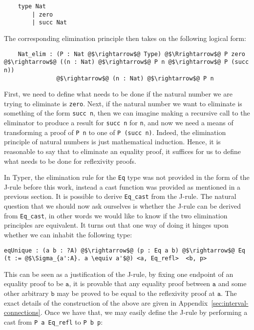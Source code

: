 \documentclass[12pt,twoside,maitrise]{dms}
\theoremstyle{definition}
\numberwithin{equation}{section}
\numberwithin{table}{chapter}
\numberwithin{figure}{chapter}
\newcommand\id[1] {\texttt{#1}}
\newcommand\fn[1] {\texttt{#1}}
\begin{document}
\begin{verbatim}
    type Nat
        | zero
        | succ Nat
\end{verbatim}

The corresponding elimination principle then takes on the following logical form:

\begin{verbatim}
    Nat_elim : (P : Nat @$\rightarrow$@ Type) @$\Rrightarrow$@ P zero @$\rightarrow$@ ((n : Nat) @$\rightarrow$@ P n @$\rightarrow$@ P (succ n))
               @$\rightarrow$@ (n : Nat) @$\rightarrow$@ P n
\end{verbatim}

First, we need to define what needs to be done if the natural number we are
trying to eliminate is \id{zero}. Next, if the natural number we want to
eliminate is something of the form \fn{succ n}, then we can imagine making a
recursive call to the eliminator to produce a result for \fn{succ n} for \id{n},
and now we need a means of transforming a proof of \fn{P n} to one of \fn{P
  (succ n)}. Indeed, the elimination principle of natural numbers is just
mathematical induction. Hence, it is reasonable to say that to eliminate an
equality proof, it suffices for us to define what needs to be done for
reflexivity proofs.

In Typer, the elimination rule for the \id{Eq} type was not provided in the form
of the J-rule before this work, instead a cast function was provided as
mentioned in a previous section. It is possible to derive \id{Eq\_cast} from the
J-rule. The natural question that we should now ask ourselves is whether the
J-rule can be derived from \id{Eq\_cast}, in other words we would like to know
if the two elimination principles are equivalent. It turns out that one way of
doing it hinges upon whether we can inhabit the following type:

\begin{verbatim}
eqUnique : (a b : ?A) @$\rightarrow$@ (p : Eq a b) @$\rightarrow$@ Eq (t := @$\Sigma_{a':A}. a \equiv a'$@) <a, Eq_refl>  <b, p>
\end{verbatim}

This can be seen as a justification of the J-rule, by fixing one endpoint of an
equality proof to be $\fn{a}$, it is provable that any equality proof between
$\fn{a}$ and some other arbitrary $\fn{b}$ may be proved to be equal to the
reflexivity proof at $\fn{a}$. The exact details of the construction of the
above are given in Appendix~\ref{sec:interval-connections}. Once we have that,
we may easily define the J-rule by performing a cast from \fn{P a Eq\_refl} to
\fn{P b p}:
\end{document}
